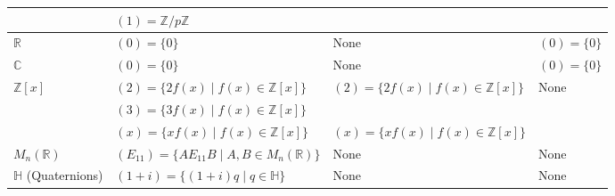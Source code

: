 \documentclass[11pt,openany]{article}
\begin{document}
\begin{center}
\begin{tabular}{|>{\centering\arraybackslash}m{4cm}|>{\centering\arraybackslash}m{4cm}|>{\centering\arraybackslash}m{4cm}|>{\centering\arraybackslash}m{4cm}|}
			& \((1) = \mathbb{Z}/p\mathbb{Z}\) &  &  \\
			\hline
			\(\mathbb{R}\) & \((0) = \{0\}\) & None & \((0) = \{0\}\) \\
			\hline
			\(\mathbb{C}\) & \((0) = \{0\}\) & None & \((0) = \{0\}\) \\
			\hline
			\(\mathbb{Z}[x]\) & \((2) = \{2 f(x) \mid f(x) \in \mathbb{Z}[x]\}\) & \((2) = \{2 f(x) \mid f(x) \in \mathbb{Z}[x]\}\) & None \\
			& \((3) = \{3 f(x) \mid f(x) \in \mathbb{Z}[x]\}\) &  &  \\
			& \((x) = \{x f(x) \mid f(x) \in \mathbb{Z}[x]\}\) & \((x) = \{x f(x) \mid f(x) \in \mathbb{Z}[x]\}\) &  \\
			\hline
			\(M_n(\mathbb{R})\) & \((E_{11}) = \{A E_{11} B \mid A, B \in M_n(\mathbb{R})\}\) & None & None \\
			\hline
			\(\mathbb{H}\) (Quaternions) & \((1+i) = \{(1+i) q \mid q \in \mathbb{H}\}\) & None & None \\
			\hline
		\end{tabular}
	\end{center}
	
\end{document}
